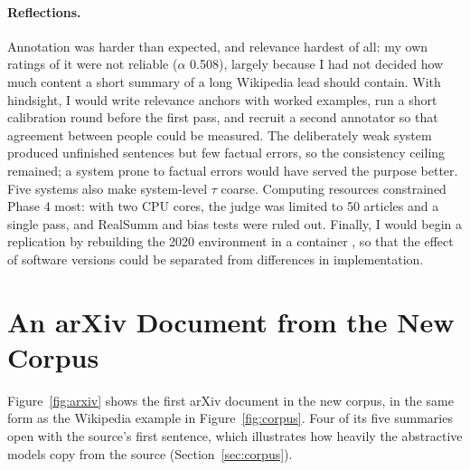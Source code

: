 \documentclass[11pt]{article}
\begin{document}
\paragraph{Reflections.}
Annotation was harder than expected, and relevance hardest of all: my own ratings of it were not reliable ($\alpha$ 0.508), largely because I had not decided how much content a short summary of a long Wikipedia lead should contain. With hindsight, I would write relevance anchors with worked examples, run a short calibration round before the first pass, and recruit a second annotator so that agreement between people could be measured. The deliberately weak system produced unfinished sentences but few factual errors, so the consistency ceiling remained; a system prone to factual errors would have served the purpose better. Five systems also make system-level $\tau$ coarse. Computing resources constrained Phase 4 most: with two CPU cores, the judge was limited to 50 articles and a single pass, and RealSumm and bias tests were ruled out. Finally, I would begin a replication by rebuilding the 2020 environment in a container \citep{howe-2012-virtual}, so that the effect of software versions could be separated from differences in implementation.



\appendix

\section{An arXiv Document from the New Corpus}
\label{app:arxiv}

Figure~\ref{fig:arxiv} shows the first arXiv document in the new corpus, in the same form as the Wikipedia example in Figure~\ref{fig:corpus}. Four of its five summaries open with the source's first sentence, which illustrates how heavily the abstractive models copy from the source (Section~\ref{sec:corpus}).
\end{document}
